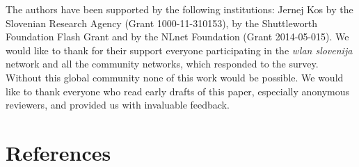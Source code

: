 \documentclass[5p,sort&compress]{elsarticle}
\newcommand{\wlanslovenija}{\textit{wlan slovenija}}
\begin{document}
The authors have been supported by the following institutions: Jernej Kos by the Slovenian Research Agency (Grant 1000-11-310153), by the Shuttleworth Foundation Flash Grant and by the NLnet Foundation (Grant 2014-05-015).
We would like to thank for their support everyone participating in the \wlanslovenija{} network and all the community networks, which responded to the survey.
Without this global community none of this work would be possible.
We would like to thank everyone who read early drafts of this paper, especially anonymous reviewers, and provided us with invaluable feedback.

\section*{References}

\end{document}
